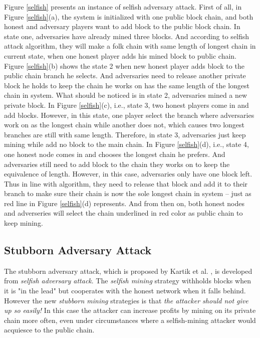 \documentclass{llncs}
\begin{document}
Figure \ref{selfish} presents an instance of selfish adversary attack.
First of all, in Figure \ref{selfish}(a), the system is initialized with one public block chain, and both honest and adversary players want to add block to the public block chain. In state one, adversaries have already mined three blocks. And according to selfish attack algorithm, they will make a folk chain with same length of longest chain in current state, when one honest player adds his mined block to public chain. Figure \ref{selfish}(b) shows the state 2 when new honest player adds block to the public chain branch he selects. And adversaries need to release another private block he holds to keep the chain he works on has the same length of the longest chain in system. What should be noticed is in state 2, adversaries mined a new private block. In Figure \ref{selfish}(c), i.e., state 3, two honest players come in and add blocks. However, in this state, one player select the branch where adversaries work on as the longest chain while another does not, which causes two longest branches are still with same length. Therefore, in state 3, adversaries just keep mining while add no block to the main chain. In Figure \ref{selfish}(d), i.e., state 4, one honest node comes in and chooses the longest chain he prefers. And adversaries still need to add block to the chain they works on to keep the equivalence of length. However, in this case, adversaries only have one block left. Thus in line with algorithm, they need to release that block and add it to their branch to make sure their chain is now the sole longest chain in system -- just as red line in Figure \ref{selfish}(d) represents. And from then on, both honest nodes and adverseries will select the chain underlined in red color as public chain to keep mining.

\subsection{Stubborn Adversary Attack}
\quad The stubborn adversary attack, which is proposed by Kartik et al. \cite{Stubborn}, is developed from \emph{selfish adversary attack}. The \emph{selfish mining} strategy withholds blocks when it is "in the lead" but cooperates with the honest network when it falls behind. However the new \emph{stubborn mining} strategies is that \emph{the attacker should not give up so easily!} In this case the attacker can increase profits by mining on its private chain more often, even under circumstances where a selfish-mining attacker would acquiesce to the public chain.
\end{document}
